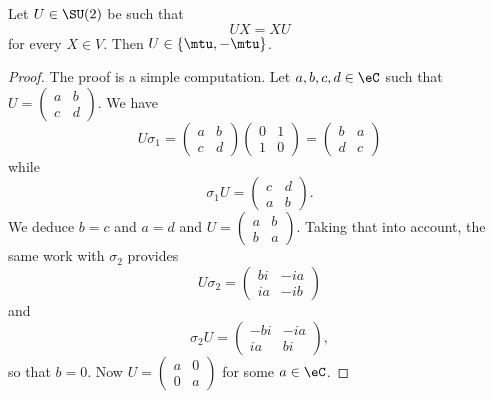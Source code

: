 \begin{proposition}       \label{PROPooHQENooUsQeiZ}
    Let \( U\in \SU(2)\) be such that 
    \begin{equation}
        UX=XU
    \end{equation}
    for every \( X\in V\). Then \( U\in\{\mtu,-\mtu\}\).
\end{proposition}

\begin{proof}
    The proof is a simple computation. Let \( a,b,c,d\in \eC\) such that \( U=\begin{pmatrix}
        a    &   b    \\ 
        c    &   d    
    \end{pmatrix}\). We have
    \begin{equation}
        U\sigma_1=\begin{pmatrix}
            a    &   b    \\ 
            c    &   d    
        \end{pmatrix}\begin{pmatrix}
            0    &   1    \\ 
            1    &   0    
        \end{pmatrix}=\begin{pmatrix}
            b    &   a    \\ 
            d    &   c    
        \end{pmatrix}
    \end{equation}
    while
    \begin{equation}
        \sigma_1U=\begin{pmatrix}
            c    &   d    \\ 
            a    &   b    
        \end{pmatrix}.
    \end{equation}
    We deduce \( b=c\) and \( a=d\) and \( U=\begin{pmatrix}
        a    &   b    \\ 
        b    &   a    
    \end{pmatrix}\). Taking that into account, the same work with \( \sigma_2\) provides
    \begin{equation}
        U\sigma_2=\begin{pmatrix}
            bi    &   -ia    \\ 
            ia    &   -ib    
        \end{pmatrix}
    \end{equation}
    and 
    \begin{equation}
        \sigma_2U=\begin{pmatrix}
            -bi    &   -ia    \\ 
            ia    &   bi    
        \end{pmatrix},
    \end{equation}
    so that \( b=0\). Now \( U=\begin{pmatrix}
        a    &   0    \\ 
        0    &   a    
    \end{pmatrix}\) for some \( a\in \eC\).


\end{proof}
